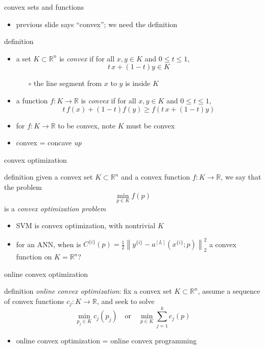 \documentclass[xcolor={svgnames},
               hyperref={colorlinks,citecolor=DeepPink4,linkcolor=FireBrick,urlcolor=Maroon}]
               {beamer}
\newcommand{\RR}{\mathbb{R}}
\begin{document}
\begin{frame}{convex sets and functions}

\begin{itemize}
\item previous slide says ``convex''; we need the definition
\end{itemize}

\begin{block}{definition}
\begin{itemize}
\item a set $K \subset \RR^n$ is \emph{convex} if for all $x,y \in K$ and $0 \le t \le 1$,
  $$t\, x + (1-t) y \in K$$

    \begin{itemize}
    \item[$\circ$] the line segment from $x$ to $y$ is inside $K$
    \end{itemize}
\item a function $f:K \to \RR$ is \emph{convex} if for all $x,y \in K$ and $0 \le t \le 1$,
  $$t\, f(x) + (1-t) f(y) \ge f(t\, x + (1-t) y)$$
\end{itemize}
\end{block}

\begin{itemize}
\item for $f:K\to \RR$ to be convex, note $K$ must be convex
\item convex = concave \emph{up}
\end{itemize}
\end{frame}


\begin{frame}{convex optimization}

\begin{block}{definition}
given a convex set $K \subset \RR^n$ and a convex function $f:K\to \RR$, we say that the problem
    $$\min_{p \in K} f(p)$$
is a \emph{convex optimization problem}
\end{block}

\begin{itemize}
\item SVM is convex optimization, with nontrivial $K$
\item for an ANN, when is $C^{\{i\}}(p) = \frac{1}{2} \left\|y^{\{i\}} - a^{[L]}(x^{\{i\}}; p)\right\|_2^2$ a convex function on $K = \RR^n$?
\end{itemize}
\end{frame}


\begin{frame}{online convex optimization}

\begin{block}{definition}
\emph{online convex optimization}:  fix a convex set $K\subset \RR^n$, assume a sequence of convex functions $c_j:K\to \RR$, and seek to solve
    $$\min_{p_j \in K} c_j(p_j) \quad \text{or} \quad \min_{p \in K} \sum_{j=1}^k c_j(p)$$
\end{block}

\begin{itemize}
\item online convex optimization = online convex programming
\end{itemize}
\end{frame}
\end{document}
